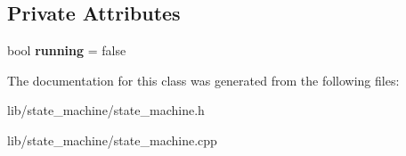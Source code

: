\subsection*{Private Attributes}
\begin{DoxyCompactItemize}
\item 
\hypertarget{class_state_machine_adc6939485a12a6250df3cc65aa172d2a}{}\label{class_state_machine_adc6939485a12a6250df3cc65aa172d2a} 
bool {\bfseries running} = false
\end{DoxyCompactItemize}


The documentation for this class was generated from the following files\+:\begin{DoxyCompactItemize}
\item 
lib/state\+\_\+machine/state\+\_\+machine.\+h\item 
lib/state\+\_\+machine/state\+\_\+machine.\+cpp\end{DoxyCompactItemize}
